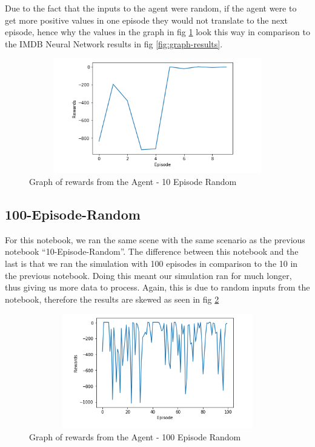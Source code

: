 Due to the fact that the inputs to the agent were random, if the agent were to get more positive values in one episode they would not translate to the next episode, hence why the values in the graph in fig \ref{fig:10EpResults} look this way in comparison to the IMDB Neural Network results in fig \ref{fig:graph-results}.

\begin{figure}[H]
    \centering
    \includegraphics[width=120mm, height=50mm]{img/random10results.PNG}
    \caption{Graph of rewards from the Agent - 10 Episode Random}
    \label{fig:10EpResults}
\end{figure}

\subsection{100-Episode-Random}
For this notebook, we ran the same scene with the same scenario as the previous notebook “10-Episode-Random”. The difference between this notebook and the last is that we ran the simulation with 100 episodes in comparison to the 10 in the previous notebook. Doing this meant our simulation ran for much longer, thus giving us more data to process. Again, this is due to random inputs from the notebook, therefore the results are skewed as seen in fig \ref{fig:100EpResults}

\begin{figure}[H]
    \centering
    \includegraphics[width=120mm, height=50mm]{img/Large100Episode.PNG}
    \caption{Graph of rewards from the Agent - 100 Episode Random}
    \label{fig:100EpResults}
\end{figure}

